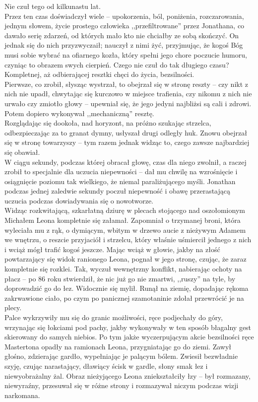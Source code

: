 \documentclass[../MAIN.tex]{subfiles}
\begin{document}
Nie czuł tego od kilkunastu lat.\\
Przez ten czas doświadczył wiele -- upokorzenia, ból, poniżenia, rozczarowania, jednym słowem, życie prostego człowieka ,,przefiltrowane'' przez Jonathana, co dawało serię zdarzeń, od których mało kto nie chciałby ze sobą skończyć. On jednak się do nich przyzwyczaił; nauczył z nimi żyć, przyjmując, że kogoś Bóg musi sobie wybrać na ofiarnego kozła, który spełni jego chore poczucie humoru, czyniąc to obrazem swych cierpień. Czego nie czuł do tak długiego czasu?\\
Kompletnej, aż odbierającej resztki chęci do życia, bezsilności.\\
Pierwsze, co zrobił, słysząc wystrzał, to obejrzał się w stronę reszty -- czy nikt z nich nie upadł, chwytając się kurczowo w miejsce trafienia, czy nikomu z nich nie urwało czy zmiotło głowy -- upewniał się, że jego jedyni najbliżsi są cali i zdrowi. Potem dopiero wykonywał ,,mechaniczną'' resztę.\\
Rozglądając się dookoła, nad horyzont, na próżno szukając strzelca, odbezpieczając za to granat dymny, usłyszał drugi odległy huk. Znowu obejrzał się w stronę towarzyszy -- tym razem jednak widząc to, czego zawsze najbardziej się obawiał.\\
W ciągu sekundy, podczas której obracał głowę, czas dla niego zwolnił, a raczej zrobił to specjalnie dla uczucia niepewności -- dał mu chwilę na wzrośnięcie i osiągnięcie poziomu tak wielkiego, że niemal paraliżującego myśli. Jonathan podczas jednej zaledwie sekundy poczuł niepewność i obawę przerastającą uczucia podczas dowiadywania się o nowotworze.\\
Widząc rozkwitającą, szkarłatną dziurę w plecach stojącego nad oszołomionym Michałem Leona kompletnie się załamał. Zapomniał o trzymanej broni, która wyleciała mu z rąk, o dymiącym, wbitym w drzewo aucie z nieżywym Adamem we wnętrzu, o reszcie przyjaciół i strzelcu, który właśnie uśmiercił jednego z nich i wciąż mógł trafić kogoś jeszcze. Mając wciąż w głowie, jakby na złość powtarzający się widok ranionego Leona, pognał w jego stronę, czując, że zaraz kompletnie się rozklei. Tak, wyczuł wewnętrzny konflikt, nabierając ochoty na płacz -- po 86 roku stwierdził, że nic już go nie zmartwi, ,,ruszy'' na tyle, by doprowadzić go do łez. Widocznie się mylił.
Runął na ziemię, dopadając rękoma zakrwawione ciało, po czym po panicznej szamotaninie zdołał przewrócić je na plecy.\\
Palce wykrzywiły mu się do granic możliwości, ręce podjechały do góry, wrzynając się łokciami pod pachy, jakby wykonywały w ten sposób błagalny gest skierowany do samych niebios. Po tym jakże wyczerpującym akcie bezsilności ręce Mastertona opadły na ramionach Leona, przygniatając go do ziemi. Zawył głośno, zdzierając gardło, wypełniając je palącym bólem. Zwiesił bezwładnie szyję, czując narastający, dławiący ścisk w gardle, słony smak łez i niewyobrażalny żal. Obraz nieżyjącego Leona zniekształciły łzy -- był rozmazany, niewyraźny, przesuwał się w różne strony i rozmazywał niczym podczas wizji narkomana.\\
\end{document}
